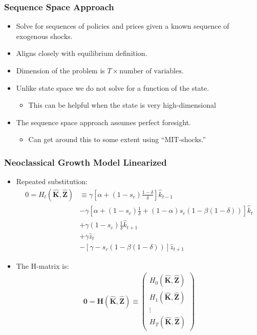 \documentclass[english,xcolor=svgnames]{beamer}
\begin{document}
\begin{frame}
    \frametitle{Sequence Space Approach}
    \begin{itemize}
        \item Solve for sequences of policies and prices given a known sequence of exogenous shocks.
        \item Aligns closely with equilibrium definition.
        \item Dimension of the problem is $T \times \text{number of variables}$.
       \item Unlike state space we do not solve for a function of the state.
       \begin{itemize}
		\item This can be helpful when the state is very high-dimensional
	   \end{itemize}
        \item The sequence space approach assumes perfect foresight. 
        \begin{itemize}
			\item Can get around this to some extent using ``MIT-shocks.''
		   \end{itemize}
	\end{itemize}
\end{frame}

\begin{frame}
	\frametitle{Neoclassical Growth Model Linearized}
	\begin{itemize}
		\item Repeated substitution:
		\begin{align*}
			0=H_t(\mathbf{\hat{K}},\mathbf{\hat{Z}})&\equiv  \gamma\left[\alpha + (1-s_c)\frac{1-\delta}{\delta}\right]\hat{k}_{t-1} \\
			&-\gamma \left[\alpha + (1-s_c)\frac{1}{\delta}+(1-\alpha)s_c(1 - \beta(1-\delta))\right]\hat{k}_{t} \\
			&   +\gamma  (1-s_c)\frac{1}{\delta}\hat{k}_{t+1} \\
			&+ \gamma \hat{z}_t \\
			& -\left[\gamma-s_c(1 - \beta(1-\delta)) \right]  \hat{z}_{t+1} 
		\end{align*}
	 \item The H-matrix is:
		\begin{align*}
			\mathbf{0} = \mathbf{H}(\mathbf{\hat{K}},\mathbf{\hat{Z}}) \equiv \begin{pmatrix}
				H_0(\mathbf{\hat{K}},\mathbf{\hat{Z}}) \\
				H_1(\mathbf{\hat{K}},\mathbf{\hat{Z}}) \\
				\vdots \\
				H_T(\mathbf{\hat{K}},\mathbf{\hat{Z}})
			\end{pmatrix}
		\end{align*}
		\end{itemize}
 \end{frame}
\end{document}
